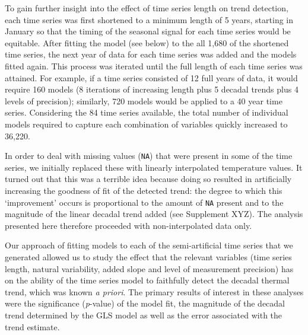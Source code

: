 \documentclass{ametsoc}
\begin{document}
To gain further insight into the effect of time series length on trend detection, each time series was first shortened to a minimum length of 5 years, starting in January so that the timing of the seasonal signal for each time series would be equitable. After fitting the model (see below) to the all 1,680 of the shortened time series, the next year of data for each time series was added and the models fitted again. This process was iterated until the full length of each time series was attained. For example, if a time series consisted of 12 full years of data, it would require 160 models (8 iterations of increasing length plus 5 decadal trends plus 4 levels of precision); similarly, 720 models would be applied to a 40 year time series. Considering the 84 time series available, the total number of individual models required to capture each combination of variables quickly increased to 36,220.

In order to deal with missing values (\texttt{NA}) that were present in some of the time series, we initially replaced these with linearly interpolated temperature values. It turned out that this was a terrible idea because doing so resulted in artificially increasing the goodness of fit of the detected trend: the degree to which this `improvement' occurs is proportional to the amount of \texttt{NA} present and to the magnitude of the linear decadal trend added (see Supplement XYZ). The analysis presented here therefore proceeded with non-interpolated data only.

Our approach of fitting models to each of the semi-artificial time series that we generated allowed us to study the effect that the relevant variables (time series length, natural variability, added slope and level of measurement precision) has on the ability of the time series model to faithfully detect the decadal thermal trend, which was known \emph{a priori}. The primary results of interest in these analyses were the significance (\emph{p}-value) of the model fit, the magnitude of the decadal trend determined by the GLS model as well as the error associated with the trend estimate.
\end{document}
